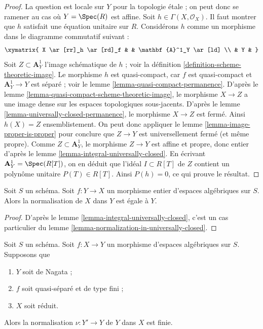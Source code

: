 \begin{proof}
La question est locale sur $Y$ pour la topologie étale ; on peut donc se ramener au
cas où $Y = \Spec(R)$ est affine. Soit $h \in \Gamma(X, \mathcal{O}_X)$.
Il faut montrer que $h$ satisfait une équation unitaire sur $R$. Considérons $h$
comme un morphisme dans le diagramme commutatif suivant :
$$
\xymatrix{
X \ar[rr]_h \ar[rd]_f & & \mathbf{A}^1_Y \ar[ld] \\
& Y &
}
$$
Soit $Z \subset \mathbf{A}^1_Y$ l'image schématique de $h$ ;
voir la définition \ref{definition-scheme-theoretic-image}.
Le morphisme $h$ est quasi-compact, car $f$ est quasi-compact et
$\mathbf{A}^1_Y \to Y$ est séparé ; voir
le lemme \ref{lemma-quasi-compact-permanence}.
D'après le lemme \ref{lemma-quasi-compact-scheme-theoretic-image}, le
morphisme $X \to Z$ a une image dense sur les espaces topologiques sous-jacents. D'après
le lemme \ref{lemma-universally-closed-permanence}, le morphisme
$X \to Z$ est fermé. Ainsi $h(X) = Z$ ensemblistement.
On peut donc appliquer
le lemme \ref{lemma-image-proper-is-proper}
pour conclure que $Z \to Y$ est universellement fermé (et même propre).
Comme $Z \subset \mathbf{A}^1_Y$, le morphisme $Z \to Y$ est affine
et propre, donc entier d'après le lemme \ref{lemma-integral-universally-closed}.
En écrivant $\mathbf{A}^1_Y = \Spec(R[T])$, on en déduit que
l'idéal $I \subset R[T]$ de $Z$ contient un polynôme unitaire
$P(T) \in R[T]$. Ainsi $P(h) = 0$, ce qui prouve le résultat.
\end{proof}

\begin{lemma}
\label{lemma-normalization-in-integral}
Soit $S$ un schéma. Soit $f : Y \to X$ un morphisme entier
d'espaces algébriques sur $S$.
Alors la normalisation de $X$ dans $Y$ est égale à $Y$.
\end{lemma}

\begin{proof}
D'après le lemme \ref{lemma-integral-universally-closed}, c'est un cas particulier du
lemme \ref{lemma-normalization-in-universally-closed}.
\end{proof}

\begin{lemma}
\label{lemma-nagata-normalization-finite}
Soit $S$ un schéma. Soit $f : X \to Y$ un morphisme d'espaces algébriques
sur $S$. Supposons que
\begin{enumerate}
\item $Y$ soit de Nagata ;
\item $f$ soit quasi-séparé et de type fini ;
\item $X$ soit réduit.
\end{enumerate}
Alors la normalisation $\nu : Y' \to Y$ de $Y$ dans $X$ est finie.
\end{lemma}

